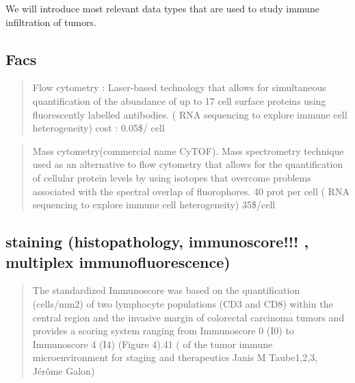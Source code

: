 \documentclass[12pt,]{book}
\theoremstyle{definition}
\theoremstyle{definition}
\theoremstyle{definition}
\theoremstyle{remark}
\begin{document}
We will introduce most relevant data types that are used to study immune
infiltration of tumors.

\hypertarget{facs}{%
\subsection{Facs}\label{facs}}

\begin{quote}
Flow cytometry : Laser-based technology that allows for simultaneous
quantification of the abundance of up to 17 cell surface proteins using
fluorescently labelled antibodies. (\citet{Single-cell} RNA sequencing
to explore immune cell heterogeneity) cost : 0.05\$/ cell
\end{quote}

\begin{quote}
Mass cytometry(commercial name CyTOF). Mass spectrometry technique used
as an alternative to flow cytometry that allows for the quantification
of cellular protein levels by using isotopes that overcome problems
associated with the spectral overlap of fluorophores. 40 prot per cell
(\citet{Single-cell} RNA sequencing to explore immune cell
heterogeneity) 35\$/cell
\end{quote}

\hypertarget{staining}{%
\subsection{staining (histopathology, immunoscore!!! , multiplex
immunofluorescence)}\label{staining}}

\begin{quote}
The standardized Immunoscore was based on the quantification (cells/mm2)
of two lymphocyte populations (CD3 and CD8) within the central region
and the invasive margin of colorectal carcinoma tumors and provides a
scoring system ranging from Immunoscore 0 (I0) to Immunoscore 4 (I4)
(Figure 4).41 (\citet{Implications} of the tumor immune microenvironment
for staging and therapeutics Janis M Taube1,2,3, Jérôme Galon)
\end{quote}
\end{document}

